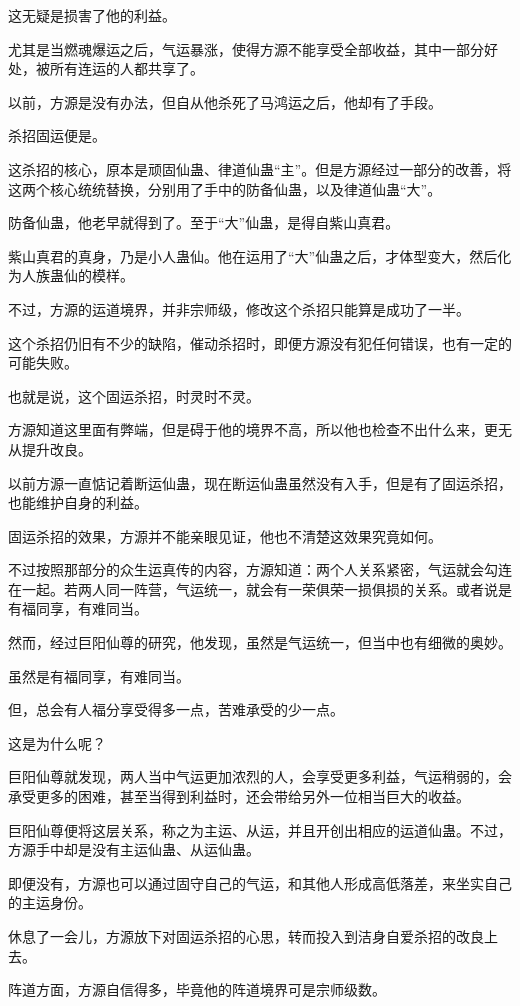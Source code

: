 \begin{this_body}
这无疑是损害了他的利益。

尤其是当燃魂爆运之后，气运暴涨，使得方源不能享受全部收益，其中一部分好处，被所有连运的人都共享了。

以前，方源是没有办法，但自从他杀死了马鸿运之后，他却有了手段。

杀招固运便是。

这杀招的核心，原本是顽固仙蛊、律道仙蛊“主”。但是方源经过一部分的改善，将这两个核心统统替换，分别用了手中的防备仙蛊，以及律道仙蛊“大”。

防备仙蛊，他老早就得到了。至于“大”仙蛊，是得自紫山真君。

紫山真君的真身，乃是小人蛊仙。他在运用了“大”仙蛊之后，才体型变大，然后化为人族蛊仙的模样。

不过，方源的运道境界，并非宗师级，修改这个杀招只能算是成功了一半。

这个杀招仍旧有不少的缺陷，催动杀招时，即便方源没有犯任何错误，也有一定的可能失败。

也就是说，这个固运杀招，时灵时不灵。

方源知道这里面有弊端，但是碍于他的境界不高，所以他也检查不出什么来，更无从提升改良。

以前方源一直惦记着断运仙蛊，现在断运仙蛊虽然没有入手，但是有了固运杀招，也能维护自身的利益。

固运杀招的效果，方源并不能亲眼见证，他也不清楚这效果究竟如何。

不过按照那部分的众生运真传的内容，方源知道：两个人关系紧密，气运就会勾连在一起。若两人同一阵营，气运统一，就会有一荣俱荣一损俱损的关系。或者说是有福同享，有难同当。

然而，经过巨阳仙尊的研究，他发现，虽然是气运统一，但当中也有细微的奥妙。

虽然是有福同享，有难同当。

但，总会有人福分享受得多一点，苦难承受的少一点。

这是为什么呢？

巨阳仙尊就发现，两人当中气运更加浓烈的人，会享受更多利益，气运稍弱的，会承受更多的困难，甚至当得到利益时，还会带给另外一位相当巨大的收益。

巨阳仙尊便将这层关系，称之为主运、从运，并且开创出相应的运道仙蛊。不过，方源手中却是没有主运仙蛊、从运仙蛊。

即便没有，方源也可以通过固守自己的气运，和其他人形成高低落差，来坐实自己的主运身份。

休息了一会儿，方源放下对固运杀招的心思，转而投入到洁身自爱杀招的改良上去。

阵道方面，方源自信得多，毕竟他的阵道境界可是宗师级数。


\end{this_body}
